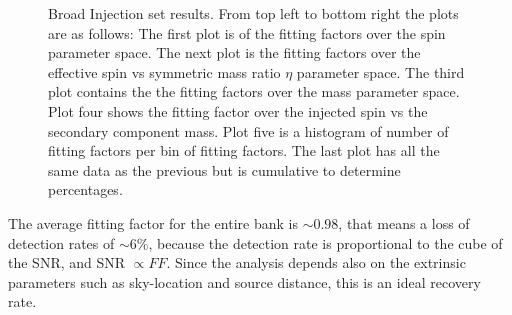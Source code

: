 \documentclass[binding=0.6cm, LaM]{sapthesis}
\begin{document}
		\begin{figure}[H]
                        \noindent
                        \label{fittingfactor}
                        \centering
                        \caption{Broad Injection set results. From top left to bottom right the plots are as follows: The first plot is of the fitting factors over the spin parameter space. The next plot is the fitting factors over the effective spin vs symmetric mass ratio $\eta$ parameter space. The third plot contains the the fitting factors over the mass parameter space. 
Plot four shows the fitting factor over the injected spin vs the secondary component mass. Plot five is a histogram of number of fitting factors per bin of fitting factors. The last plot has all the same data as the previous but is cumulative to determine percentages.}
                        \label{fig:fittingfactor}
                \end{figure}
	The average fitting factor for the entire bank is $\sim0.98$, that means a loss of detection rates of $\sim6\%$,
	because the detection rate  is proportional to the cube of the SNR, and SNR $\propto FF$.
	Since the analysis depends also on the extrinsic parameters such as sky-location and source distance,
	this is an ideal recovery rate.
\end{document}
